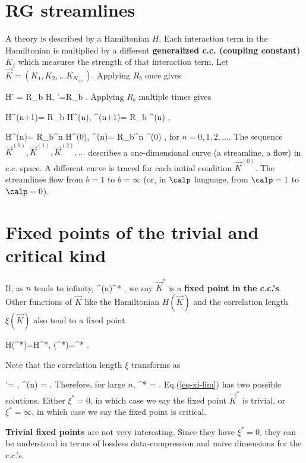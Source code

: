 \section{RG streamlines}
A theory is described by a Hamiltonian
$H$. Each interaction term
in the Hamiltonian is
multiplied
by a different \textbf{generalized c.c. (coupling
constant)} $K_j$
which measures
the strength of that
interaction term. Let
$\vec{K} = (K_1, K_2, \ldots K_{N_{c.c.}})$.
Applying $R_b$ once
gives

\beq
H' = R_b H,\;\; '=R_b
\;.
\eeq
Applying $R_b$ multiple times gives

\beq
H^{(n+1)}= R_b H^{(n)},
\;\;
^{(n+1)}= R_b ^{(n)}
\;,
\eeq

\beq
H^{(n)}= R_b^n H^{(0)},
\;\;
^{(n)}= R_b^n ^{(0)}
\;,
\eeq
for $n=0,1,2, \ldots$. The
sequence $\vec{K}^{(0)},
\vec{K}^{(1)}, \vec{K}^{(2)}, \ldots$
describes a one-dimensional curve
(a streamline, a flow)
in c.c. space. A different curve
is traced for
each initial condition
$\vec{K}^{(0)}$. The streamlines
flow from $b=1$ to $b=\infty$ (or,
in $\calp$ language,
from $\calp=1$ to $\calp=0$).

\section{Fixed points of the trivial
and critical kind}

If, as $n$ tends to infinity,
\beq
{}^{(n)}\rightarrow {}^*
\;,
\eeq
we say $\vec{K}^*$ is a
\textbf{fixed point in the c.c.'s}.
Other functions of $\vec{K}$
like the Hamiltonian $H(\vec{K})$
and the correlation length $\xi(\vec{K})$
also tend to a fixed point

\beq
H(^*)=H^*,
\;\;
\xi(^*)=\xi^*
\;.
\eeq


Note that the correlation length
$\xi$ transforms as

\beq
\xi'=
\;,\;\;
\xi^{(n)} = 
\;.
\label{eq-xi-zero-to-n}
\eeq
Therefore, for large $n$,
\beq
\xi^* = 
\;.
\label{eq-xi-lim}
\eeq
Eq.(\ref{eq-xi-lim}) has two possible solutions.
Either $\xi^* = 0$, in which case
we say the fixed point $\vec{K}^*$
is trivial, or $\xi^* = \infty$,
in which case we say the fixed point
is critical.


\textbf{Trivial fixed points} are not
very interesting. Since they
have $\xi^*=0$, they can be understood
in terms of
lossless data-compression and
naive dimensions for the c.c.'s.


